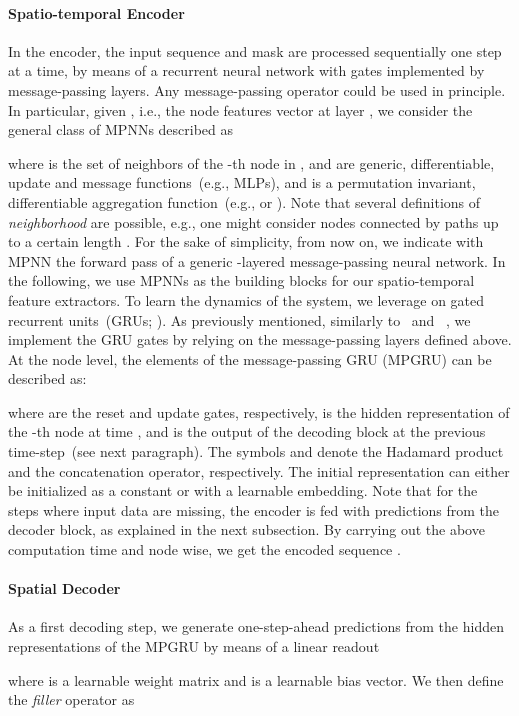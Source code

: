 \documentclass{article} \usepackage{iclr2022_conference,times}
\begin{document}
\paragraph{Spatio-temporal Encoder} In the encoder, the input sequence  and mask  are processed sequentially one step at a time, by means of a recurrent neural network with gates implemented by message-passing layers. 
Any message-passing operator could be used in principle. In particular, given , i.e., the node features vector at layer ,  we consider the general class of MPNNs described as

where  is the set of neighbors of the -th node in ,  and  are generic, differentiable, update and message functions~(e.g., MLPs), and  is a permutation invariant, differentiable aggregation function~(e.g.,  or ). Note that several definitions of \emph{neighborhood} are possible, e.g., one might consider nodes connected by paths up to a certain length . For the sake of simplicity, from now on, we indicate with MPNN the forward pass of a generic -layered message-passing neural network.
In the following, we use MPNNs as the building blocks for our spatio-temporal feature extractors.
To learn the dynamics of the system, we leverage on gated recurrent units~(GRUs; \citealp{cho2014learning}). As previously mentioned, similarly to~\citet{seo2018structured} and ~\citet{li2018diffusion}, we implement the GRU gates by relying on the message-passing layers defined above. At the node level, the elements of the message-passing GRU (MPGRU) can be described as:

where  are the reset and update gates, respectively,  is the hidden representation of the -th node at time , and  is the output of the decoding block at the previous time-step~(see next paragraph). The symbols  and  denote the Hadamard product and the concatenation operator, respectively. The initial representation  can either be initialized as a constant or with a learnable embedding. Note that for the steps where input data are missing, the encoder is fed with predictions from the decoder block, as explained in the next subsection. By carrying out the above computation time and node wise, we get the encoded sequence .
\paragraph{Spatial Decoder} As a first decoding step, we generate one-step-ahead predictions from the hidden representations of the MPGRU by means of a linear readout

where  is a learnable weight matrix and  is a learnable bias vector. We then define the \emph{filler} operator as
\end{document}

